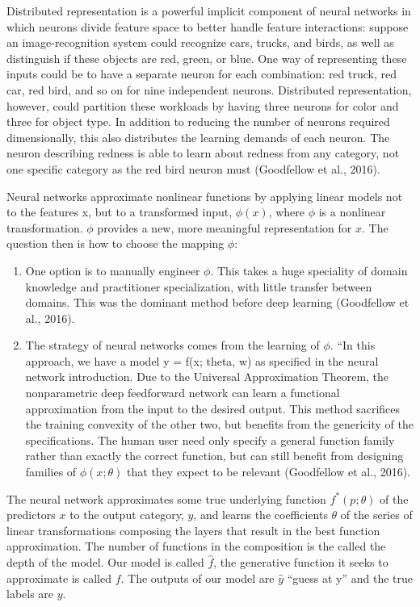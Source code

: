\documentclass[12pt,twoside]{reedthesis}
\begin{document}
Distributed representation is a powerful implicit component of neural
networks in which neurons divide feature space to better handle feature
interactions: suppose an image-recognition system could recognize cars,
trucks, and birds, as well as distinguish if these objects are red,
green, or blue. One way of representing these inputs could be to have a
separate neuron for each combination: red truck, red car, red bird, and
so on for nine independent neurons. Distributed representation, however,
could partition these workloads by having three neurons for color and
three for object type. In addition to reducing the number of neurons
required dimensionally, this also distributes the learning demands of
each neuron. The neuron describing redness is able to learn about
redness from any category, not one specific category as the red bird
neuron must (Goodfellow et al., 2016).

Neural networks approximate nonlinear functions by applying linear
models not to the features x, but to a transformed input, \(\phi(x)\),
where \(\phi\) is a nonlinear transformation. \(\phi\) provides a new,
more meaningful representation for \(x\). The question then is how to
choose the mapping \(\phi\):
\begin{enumerate}
\def\labelenumi{\arabic{enumi}.}
\item
  One option is to manually engineer \(\phi\). This takes a huge
  speciality of domain knowledge and practitioner specialization, with
  little transfer between domains. This was the dominant method before
  deep learning (Goodfellow et al., 2016).
\item
  The strategy of neural networks comes from the learning of \(\phi\).
  ``In this approach, we have a model y = f(x; theta, w) as specified in
  the neural network introduction. Due to the Universal Approximation
  Theorem, the nonparametric deep feedforward network can learn a
  functional approximation from the input to the desired output. This
  method sacrifices the training convexity of the other two, but
  benefits from the genericity of the specifications. The human user
  need only specify a general function family rather than exactly the
  correct function, but can still benefit from designing families of
  \(\phi(x; \theta)\) that they expect to be relevant (Goodfellow et
  al., 2016).
\end{enumerate}
The neural network approximates some true underlying function
\(f^*(p; \theta)\) of the predictors \(x\) to the output category,
\(y\), and learns the coefficients \(\theta\) of the series of linear
transformations composing the layers that result in the best function
approximation. The number of functions in the composition is the called
the depth of the model. Our model is called \(\hat f\), the generative
function it seeks to approximate is called \(f\). The outputs of our
model are \(\hat y\) ``guess at y'' and the true labels are \(y\).
\end{document}
